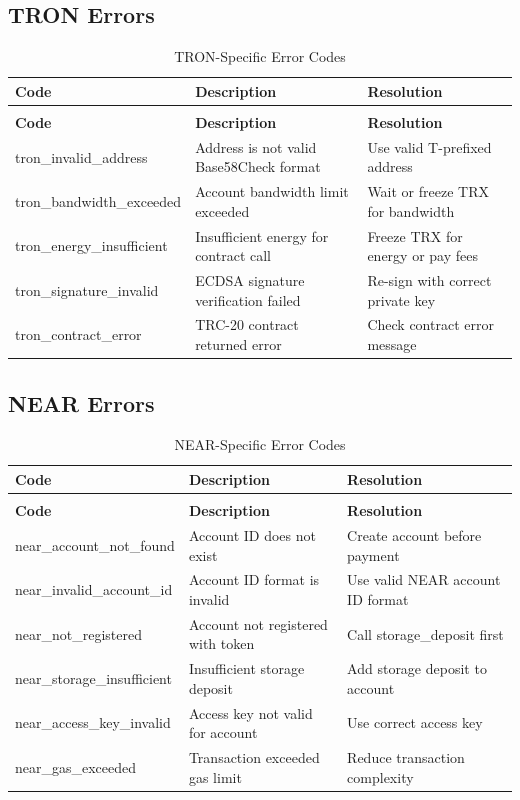 \subsection{TRON Errors}

\begin{longtable}{>{\ttfamily\footnotesize}l p{5cm} p{4cm}}
\caption{TRON-Specific Error Codes} \label{tab:tron-errors} \\
\toprule
\normalfont\textbf{Code} & \textbf{Description} & \textbf{Resolution} \\
\midrule
\endfirsthead
\multicolumn{3}{c}{\tablename\ \thetable\ -- continued} \\
\toprule
\normalfont\textbf{Code} & \textbf{Description} & \textbf{Resolution} \\
\midrule
\endhead
\midrule
\endfoot
\bottomrule
\endlastfoot
tron\_invalid\_address & Address is not valid Base58Check format & Use valid T-prefixed address \\
tron\_bandwidth\_exceeded & Account bandwidth limit exceeded & Wait or freeze TRX for bandwidth \\
tron\_energy\_insufficient & Insufficient energy for contract call & Freeze TRX for energy or pay fees \\
tron\_signature\_invalid & ECDSA signature verification failed & Re-sign with correct private key \\
tron\_contract\_error & TRC-20 contract returned error & Check contract error message \\
\end{longtable}

\subsection{NEAR Errors}

\begin{longtable}{>{\ttfamily\footnotesize}l p{5cm} p{4cm}}
\caption{NEAR-Specific Error Codes} \label{tab:near-errors} \\
\toprule
\normalfont\textbf{Code} & \textbf{Description} & \textbf{Resolution} \\
\midrule
\endfirsthead
\multicolumn{3}{c}{\tablename\ \thetable\ -- continued} \\
\toprule
\normalfont\textbf{Code} & \textbf{Description} & \textbf{Resolution} \\
\midrule
\endhead
\midrule
\endfoot
\bottomrule
\endlastfoot
near\_account\_not\_found & Account ID does not exist & Create account before payment \\
near\_invalid\_account\_id & Account ID format is invalid & Use valid NEAR account ID format \\
near\_not\_registered & Account not registered with token & Call storage\_deposit first \\
near\_storage\_insufficient & Insufficient storage deposit & Add storage deposit to account \\
near\_access\_key\_invalid & Access key not valid for account & Use correct access key \\
near\_gas\_exceeded & Transaction exceeded gas limit & Reduce transaction complexity \\
\end{longtable}


